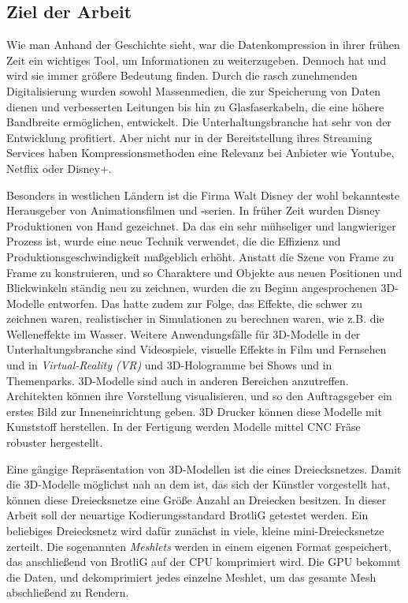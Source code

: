 \subsection{Ziel der Arbeit}
Wie man Anhand der Geschichte sieht, war die Datenkompression in ihrer frühen Zeit ein wichtiges Tool, um Informationen zu weiterzugeben.
Dennoch hat und wird sie immer größere Bedeutung finden.
Durch die rasch zunehmenden Digitalisierung wurden sowohl Massenmedien, die zur Speicherung von Daten dienen und verbesserten Leitungen bis hin zu Glasfaserkabeln, die eine höhere Bandbreite ermöglichen, entwickelt.
Die Unterhaltungsbranche hat sehr von der Entwicklung profitiert.
Aber nicht nur in der Bereitstellung ihres Streaming Services haben Kompressionsmethoden eine Relevanz bei Anbieter wie Youtube, Netflix oder Disney+. \newline

Besonders in westlichen Ländern ist die Firma Walt Disney der wohl bekannteste Herausgeber von Animationsfilmen und -serien.
In früher Zeit wurden Disney Produktionen von Hand gezeichnet.
Da das ein sehr mühseliger und langwieriger Prozess ist, wurde eine neue Technik verwendet, die die Effizienz und Produktionsgeschwindigkeit maßgeblich erhöht.
Anstatt die Szene von Frame zu Frame zu konstruieren, und so Charaktere und Objekte aus neuen Positionen und Blickwinkeln ständig neu zu zeichnen, wurden die zu Beginn angesprochenen 3D-Modelle entworfen.
Das hatte zudem zur Folge, das Effekte, die schwer zu zeichnen waren, realistischer in Simulationen zu berechnen waren, wie z.B. die Welleneffekte im Wasser.
Weitere Anwendungsfälle für 3D-Modelle in der Unterhaltungsbranche sind Videospiele, visuelle Effekte in Film und Fernsehen und in \textit{Virtual-Reality (VR)} und 3D-Hologramme bei Shows und in Themenparks. 
3D-Modelle sind auch in anderen Bereichen anzutreffen.
Architekten können ihre Vorstellung visualisieren, und so den Auftragsgeber ein erstes Bild zur Inneneinrichtung geben.
3D Drucker können diese Modelle mit Kunststoff herstellen.
In der Fertigung werden Modelle mittel CNC Fräse robuster hergestellt. \newline

Eine gängige Repräsentation von 3D-Modellen ist die eines Dreiecksnetzes.
Damit die 3D-Modelle möglichst nah an dem ist, das sich der Künstler vorgestellt hat, können diese Dreiecksnetze eine Größe Anzahl an Dreiecken besitzen.
In dieser Arbeit soll der neuartige Kodierungsstandard BrotliG getestet werden.
Ein beliebiges Dreiecksnetz wird dafür zunächst in viele, kleine mini-Dreiecksnetze zerteilt.
Die sogenannten \textit{Meshlets} werden in einem eigenen Format gespeichert, das anschließend von BrotliG auf der CPU komprimiert wird.
Die GPU bekommt die Daten, und dekomprimiert jedes einzelne Meshlet, um das gesamte Mesh abschließend zu Rendern.
